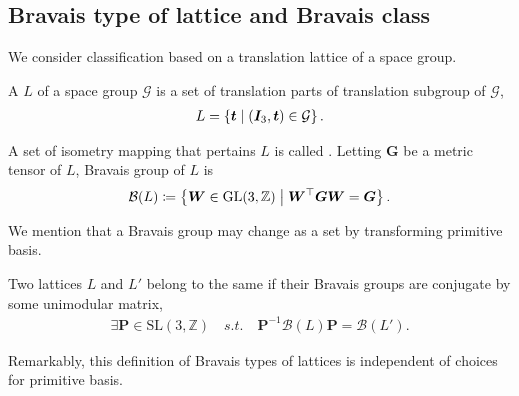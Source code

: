 
\subsection{\label{sec:bravais-class}Bravais type of lattice and Bravais class}

We consider classification based on a translation lattice of a space group.

\begin{screen}
  \begin{defn}
    A  $L$ of a space group $\mathcal{G}$ is a set of translation parts of translation subgroup of $\mathcal{G}$,
    \begin{align}
      L = \left\{  \bm{t}  \mathrel{}\middle|\mathrel{}  (\bm{I}_{3}, \bm{t}) \in \mathcal{G}  \right\}.
    \end{align}
  \end{defn}
\end{screen}

\begin{screen}
  \begin{defn}
    A set of isometry mapping that pertains $L$ is called .
    Letting $\bm{G}$ be a metric tensor of $L$, Bravais group of $L$ is
    \begin{align}
      \mathcal{B}(L) \coloneqq \left\{  \bm{W} \in \mathrm{GL}(3, \mathbb{Z})  \mathrel{}\middle|\mathrel{}  \bm{W}^{\top}\bm{GW} = \bm{G}  \right\}.
    \end{align}
  \end{defn}
\end{screen}

We mention that a Bravais group may change as a set by transforming primitive basis.

\begin{screen}
  \begin{defn}
    Two lattices $L$ and $L'$ belong to the same  if their Bravais groups are conjugate by some unimodular matrix,
    \begin{align}
      \exists \bm{P} \in \mathrm{SL}(3, \mathbb{Z}) \quad s.t. \quad \bm{P}^{-1} \mathcal{B}(L) \bm{P} = \mathcal{B}(L').
    \end{align}
  \end{defn}
\end{screen}
Remarkably, this definition of Bravais types of lattices is independent of choices for primitive basis.

